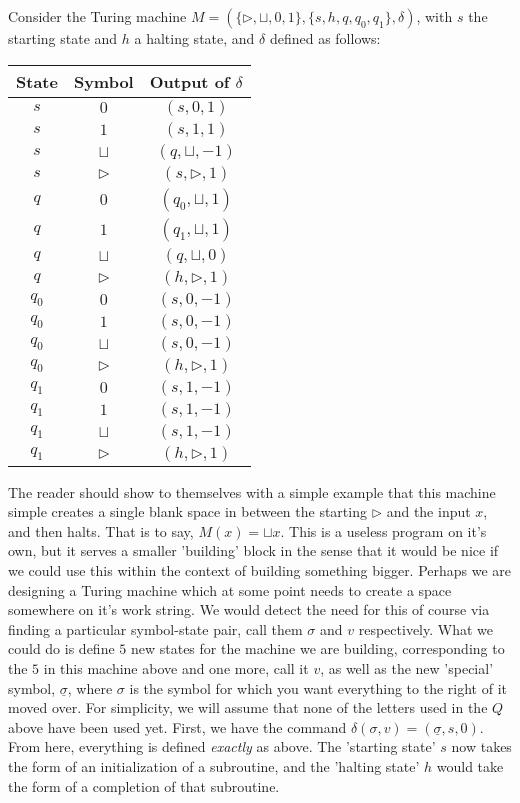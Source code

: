 Consider the Turing machine $M = (\{\triangleright,\sqcup,0,1\},\{s,h,q,q_0,q_1\},\delta)$, with $s$ the starting state and $h$ a halting state, and $\delta$ defined as follows:
\begin{center}
\begin{tabular}{ |c c|c| } 
 \hline
 State & Symbol & Output of $\delta$ \\ 
 \hline
 $s$ & $0$ & $(s,0,1)$ \\ 
 $s$ & $1$ & $(s,1,1)$ \\ 
 $s$ & $\sqcup$ & $(q,\sqcup,-1)$ \\
 $s$ & $\triangleright$ & $(s,\triangleright,1)$ \\
 $q$ & $0$ & $(q_0,\sqcup,1)$ \\
 $q$ & $1$ & $(q_1,\sqcup,1)$ \\
 $q$ & $\sqcup$ & $(q,\sqcup,0)$ \\
 $q$ & $\triangleright$ & $(h,\triangleright,1)$ \\
 $q_0$ & $0$ & $(s,0,-1)$ \\
 $q_0$ & $1$ & $(s,0,-1)$ \\
 $q_0$ & $\sqcup$ & $(s,0,-1)$ \\
 $q_0$ & $\triangleright$ & $(h,\triangleright,1)$ \\
 $q_1$ & $0$ & $(s,1,-1)$ \\
 $q_1$ & $1$ & $(s,1,-1)$ \\
 $q_1$ & $\sqcup$ & $(s,1,-1)$ \\
 $q_1$ & $\triangleright$ & $(h,\triangleright,1)$ \\
 \hline
\end{tabular}
\end{center}
The reader should show to themselves with a simple example that this machine simple creates a single blank space in between the starting $\triangleright$ and the input $x$, and then halts. That is to say, $M(x) = \sqcup x$. This is a useless program on it's own, but it serves a smaller 'building' block in the sense that it would be nice if we could use this within the context of building something bigger. Perhaps we are designing a Turing machine which at some point needs to create a space somewhere on it's work string. We would detect the need for this of course via finding a particular symbol-state pair, call them $\sigma$ and $v$ respectively. What we could do is define $5$ new states for the machine we are building, corresponding to the $5$ in this machine above and one more, call it $v$, as well as the new 'special' symbol, $\underline{\sigma}$, where $\sigma$ is the symbol for which you want everything to the right of it moved over. For simplicity, we will assume that none of the letters used in the $Q$ above have been used yet. First, we have the command $\delta(\sigma,v) = (\underline{\sigma},s,0)$. From here, everything is defined \textit{exactly} as above. The 'starting state' $s$ now takes the form of an initialization of a subroutine, and the 'halting state' $h$ would take the form of a completion of that subroutine. 

